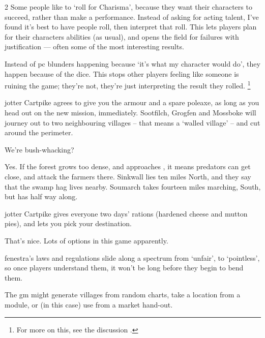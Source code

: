 \begin{multicols}{2}
Some people like to `roll for Charisma', because they want their characters to
succeed, rather than make a performance.  Instead of asking for acting talent,
I've found it's best to have people roll, then interpret that roll.  This lets
players plan for their characters abilities (as usual), and opens the field for
failures with justification --- often some of the most interesting results.

Instead of \gls{pc} blunders happening because `it's what my character would
do', they happen because of the dice.  This stops other players feeling like
someone is ruining the game; they're not, they're just interpreting the result
they rolled.%
\footnote{For more on this, see the discussion
.}

\bigLine

\begin{description}\sffamily
  \item[\Gls{gm}:] \Gls{jotter} Cartpike agrees to give you the armour and a
  spare poleaxe, as long as you head out on the new mission, immediately.
  Sootfilch, Grogfen and Mossboke will journey out to two neighbouring
  \glspl{village} -- that means a `walled village' -- and cut around the
  perimeter.

  \item[Player 1:] We're bush-whacking?  \item[\Gls{gm}:] Yes.  If the forest
  grows too dense, and approaches , it means predators can get
  close, and attack the farmers there.
  Sinkwall lies ten miles North, and they say that the swamp hag lives nearby.
  Soumarch takes fourteen miles marching, South, but has  half way
  along.

  \Gls{jotter} Cartpike gives everyone two days' rations (hardened cheese and
  mutton pies), and lets you pick your destination.

  \item[Player 3:] That's nice.  Lots of options in this game apparently.
\end{description}

\bigLine

\noindent
\Gls{fenestra}'s laws and regulations slide along a spectrum from `unfair', to
`pointless', so once players understand them, it won't be long before they
begin to bend them.

The \gls{gm} might generate \glspl{village} from random charts,%
take a location from a module, or (in this case) use  from a market hand-out.


\end{multicols}

